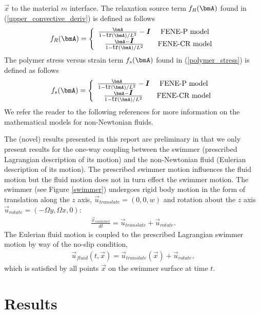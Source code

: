 \documentclass[]{article}
\newcommand{\bmI}{\mbox{\boldmath $I$\unboldmath}}
\begin{document}
$\vec{x}$ to the material $m$ interface.  The relaxation source term 
$f_{R}(\bmA)$ found in (\ref{upper_convective_deriv}) is defined as
follows
\begin{eqnarray}
	f_{R}(\bmA)=\left\{ \begin{array}{cc}
		\frac{\bmA}{1-\mbox{tr}(\bmA)/L^{2}}-\bmI &
		\mbox{FENE-P model} \\
		\frac{\bmA-\bmI}{1-\mbox{tr}(\bmA)/L^{2}} &
		                \mbox{FENE-CR model}
	\end{array}
	\right.
\end{eqnarray}
The polymer stress versus strain term $f_{s}(\bmA)$ found in
(\ref{polymer_stress}) is defined as follows
\begin{eqnarray}
	f_{s}(\bmA)=\left\{ \begin{array}{cc}
		\frac{\bmA}{1-\mbox{tr}(\bmA)/L^{2}}-\bmI &
		\mbox{FENE-P model} \\
		\frac{\bmA-\bmI}{1-\mbox{tr}(\bmA)/L^{2}} &
		                \mbox{FENE-CR model}
	\end{array}
	\right.
\end{eqnarray}
We refer the reader to the following references for more information on
the mathematical models for non-Newtonian 
fluids\cite{BIRD1980213,PURNODE19981}.

The (novel) results presented in this report are preliminary in that we only 
present results for the one-way coupling between the 
swimmer (prescribed Lagrangian description of its motion)
and the non-Newtonian fluid (Eulerian description of its motion).  The
prescribed swimmer motion influences the fluid motion but the fluid 
motion does not in turn effect the swimmer motion.  The swimmer (see
Figure \ref{swimmer}) undergoes rigid body motion in the form of
translation along the $z$ axis, $\vec{u}_{translate}=(0,0,w)$ and 
rotation about the $z$ axis $\vec{u}_{rotate}=(-\Omega y,\Omega x,0)$:
\begin{eqnarray}
	\frac{\vec{x}_{swimmer}}{dt}= 
	\vec{u}_{translate}+\vec{u}_{rotate}.
\end{eqnarray}
The Eulerian fluid motion is coupled to the prescribed Lagrangian
swimmer motion by way of the no-slip condition,
\begin{eqnarray}
	\vec{u}_{fluid}(t,\vec{x})=
	\vec{u}_{translate}(\vec{x})+\vec{u}_{rotate},
\end{eqnarray}
which is satisfied by all points $\vec{x}$ on the swimmer surface at time
$t$.

\section*{Results} 
\end{document}
